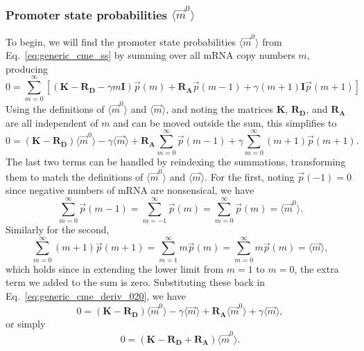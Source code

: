 \subsubsection{Promoter state probabilities $\langle\vec{m}^0\rangle$}
\label{sec:m0_appdx}
To begin, we will find the promoter state probabilities
$\langle\vec{m}^0\rangle$ from Eq.~\ref{eq:generic_cme_ss} by summing over all
mRNA copy numbers $m$, producing
\begin{equation}
0 = \sum_{m=0}^\infty \left[
    \left( \mathbf{K} - \mathbf{R_D} - \gamma m \mathbf{I} \right) \vec{p}(m)
                + \mathbf{R_A} \vec{p}(m-1) +
                \gamma (m+1) \mathbf{I} \vec{p}(m+1)
\right]
\end{equation}
Using the definitions of $\langle\vec{m}^0\rangle$ and $\langle\vec{m}\rangle$,
and noting the matrices $\mathbf{K}$, $\mathbf{R_D}$, and $\mathbf{R_A}$
are all independent of $m$ and can be moved outside the sum, this simplifies to
\begin{equation}
0 = (\mathbf{K} - \mathbf{R_D}) \langle\vec{m}^0\rangle
    - \gamma \langle\vec{m}\rangle + \mathbf{R_A} \sum_{m=0}^\infty \vec{p}(m-1)
    + \gamma \sum_{m=0}^\infty (m+1)\vec{p}(m+1).
\label{eq:generic_cme_deriv_020}
\end{equation}
The last two terms can be handled by reindexing the summations, transforming
them to match the definitions of $\langle\vec{m}^0\rangle$ and
$\langle\vec{m}\rangle$. For the first, noting $\vec{p}(-1)=0$ since negative
numbers of mRNA are nonsensical, we have
\begin{equation}
\sum_{m=0}^\infty \vec{p}(m-1)
= \sum_{m=-1}^\infty \vec{p}(m)
= \sum_{m=0}^\infty \vec{p}(m) = \langle\vec{m}^0\rangle.
\end{equation}
Similarly for the second,
\begin{equation}
\sum_{m=0}^\infty (m+1)\vec{p}(m+1)
= \sum_{m=1}^\infty m\vec{p}(m)
= \sum_{m=0}^\infty m\vec{p}(m) = \langle\vec{m}\rangle,
\end{equation}
which holds since in extending the lower limit from $m=1$ to $m=0$, the extra
term we added to the sum is zero. Substituting these back in
Eq.~\ref{eq:generic_cme_deriv_020}, we have
\begin{equation}
0 = (\mathbf{K} - \mathbf{R_D}) \langle\vec{m}^0\rangle
    - \gamma \langle\vec{m}\rangle + \mathbf{R_A} \langle\vec{m}^0\rangle
    + \gamma \langle\vec{m}\rangle,
\end{equation}
or simply
\begin{equation}
0 = (\mathbf{K} - \mathbf{R_D} + \mathbf{R_A}) \langle\vec{m}^0\rangle.
\label{eq:generic_cme_vecm0}
\end{equation}
